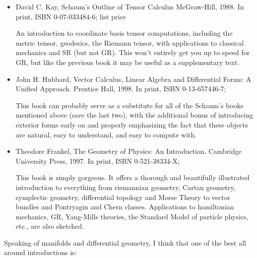 \documentclass[10pt,a4paper]{book}
\theoremstyle{definition}
\begin{document}
\begin{itemize}
\item David C. Kay,
Schaum's Outline of Tensor Calculus
McGraw-Hill, 1988.
In print, ISBN 0-07-033484-6; list price

An introduction to coordinate basis tensor computations, including the metric tensor, geodesics, the Riemann tensor, with applications to classical mechanics and SR (but not GR).  This won't entirely get you up to speed for GR, but like the previous book it may be useful as a supplementary text.

\item John H. Hubbard,
Vector Calculus, Linear Algebra and Differential Forms: A Unified Approach.
Prentice Hall, 1998.
In print, ISBN 0-13-657446-7; 

This book can probably serve as a substitute for all of the Schaum's books mentioned above (save the last two), with the additional bonus of introducing exterior forms early on and properly emphasizing the fact that these objects are natural, easy to understand, and easy to compute with.

\item Theodore Frankel,
The Geometry of Physics: An Introduction.
Cambridge University Press, 1997.
In print, ISBN 0-521-38334-X; 

This book is simply gorgeous.  It offers a thorough and beautifully illustrated introduction to everything from riemannian geometry, Cartan geometry, symplectic geometry, differential topology and Morse Theory to vector bundles and Pontryagin and Chern classes.  Applications to hamiltonian mechanics, GR, Yang-Mills theories, the Standard Model of particle physics, etc., are also sketched.
\end{itemize}



Speaking of manifolds and differential geometry, I think that one of the best all around introductions is:
\end{document}
